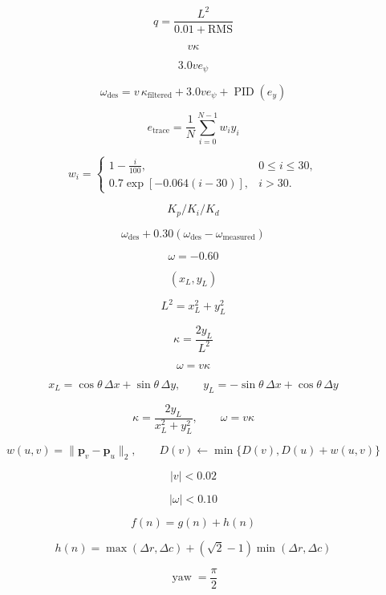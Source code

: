 \documentclass{article}
\begin{document}
\[
q=\frac{L^2}{0.01+\mathrm{RMS}}
\]

\[
v\kappa
\]

\[
3.0v e_\psi
\]

\[
\omega_{\mathrm{des}}=v\,\kappa_{\mathrm{filtered}}+3.0v e_\psi+\operatorname{PID}(e_y)
\]

\[
e_{\mathrm{trace}}=\frac{1}{N}\sum_{i=0}^{N-1}w_i y_i
\]

\[
w_i=\begin{cases}1-\frac{i}{100},&0\leq i\leq30,\\0.7\exp[-0.064(i-30)],&i>30.\end{cases}
\]

\[
K_p/K_i/K_d
\]

\[
\omega_{\mathrm{des}}+0.30(\omega_{\mathrm{des}}-\omega_{\mathrm{measured}})
\]

\[
\omega=-0.60
\]

\[
(x_L,y_L)
\]

\[
L^2=x_L^2+y_L^2
\]

\[
\kappa=\frac{2y_L}{L^2}
\]

\[
\omega=v\kappa
\]

\[
x_L=\cos\theta\,\Delta x+\sin\theta\,\Delta y,\qquad y_L=-\sin\theta\,\Delta x+\cos\theta\,\Delta y
\]

\[
\kappa=\frac{2y_L}{x_L^2+y_L^2},\qquad \omega=v\kappa
\]

\[
w(u,v)=\lVert\mathbf{p}_v-\mathbf{p}_u\rVert_2,\qquad D(v)\leftarrow\min\{D(v),D(u)+w(u,v)\}
\]

\[
|v|<0.02
\]

\[
|\omega|<0.10
\]

\[
f(n)=g(n)+h(n)
\]

\[
h(n)=\max(\Delta r,\Delta c)+(\sqrt{2}-1)\min(\Delta r,\Delta c)
\]

\[
\operatorname{yaw}=\frac{\pi}{2}
\]
\end{document}
